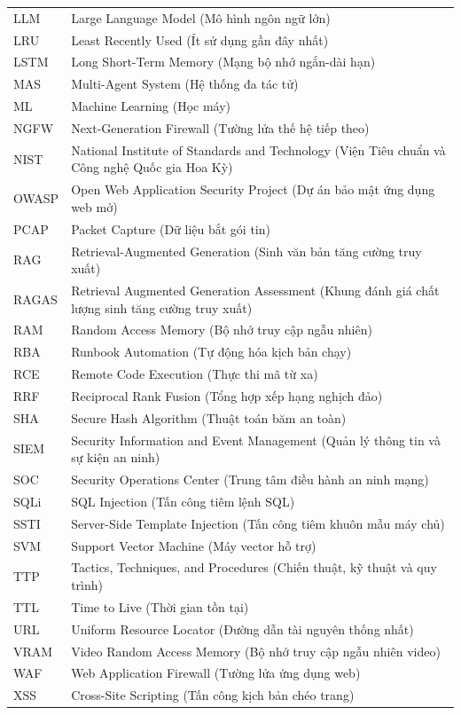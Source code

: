\documentclass[12pt,a4paper]{report}
\begin{document}
\begin{longtable}{lp{}}
LLM & Large Language Model (Mô hình ngôn ngữ lớn) \\
LRU & Least Recently Used (Ít sử dụng gần đây nhất) \\
LSTM & Long Short-Term Memory (Mạng bộ nhớ ngắn-dài hạn) \\
MAS & Multi-Agent System (Hệ thống đa tác tử) \\
ML & Machine Learning (Học máy) \\
NGFW & Next-Generation Firewall (Tường lửa thế hệ tiếp theo) \\
NIST & National Institute of Standards and Technology (Viện Tiêu chuẩn và Công nghệ Quốc gia Hoa Kỳ) \\
OWASP & Open Web Application Security Project (Dự án bảo mật ứng dụng web mở) \\
PCAP & Packet Capture (Dữ liệu bắt gói tin) \\
RAG & Retrieval-Augmented Generation (Sinh văn bản tăng cường truy xuất) \\
RAGAS & Retrieval Augmented Generation Assessment (Khung đánh giá chất lượng sinh tăng cường truy xuất) \\
RAM & Random Access Memory (Bộ nhớ truy cập ngẫu nhiên) \\
RBA & Runbook Automation (Tự động hóa kịch bản chạy) \\
RCE & Remote Code Execution (Thực thi mã từ xa) \\
RRF & Reciprocal Rank Fusion (Tổng hợp xếp hạng nghịch đảo) \\
SHA & Secure Hash Algorithm (Thuật toán băm an toàn) \\
SIEM & Security Information and Event Management (Quản lý thông tin và sự kiện an ninh) \\
SOC & Security Operations Center (Trung tâm điều hành an ninh mạng) \\
SQLi & SQL Injection (Tấn công tiêm lệnh SQL) \\
SSTI & Server-Side Template Injection (Tấn công tiêm khuôn mẫu máy chủ) \\
SVM & Support Vector Machine (Máy vector hỗ trợ) \\
TTP & Tactics, Techniques, and Procedures (Chiến thuật, kỹ thuật và quy trình) \\
TTL & Time to Live (Thời gian tồn tại) \\
URL & Uniform Resource Locator (Đường dẫn tài nguyên thống nhất) \\
VRAM & Video Random Access Memory (Bộ nhớ truy cập ngẫu nhiên video) \\
WAF & Web Application Firewall (Tường lửa ứng dụng web) \\
XSS & Cross-Site Scripting (Tấn công kịch bản chéo trang) \\
\bottomrule
\end{longtable}
\newpage
\tableofcontents
\end{document}
